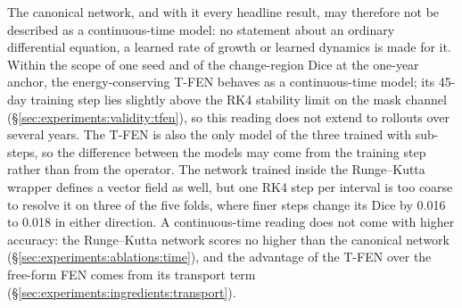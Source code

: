 The canonical network, and with it every headline result, may therefore
not be described as a continuous-time model: no statement about an ordinary
differential equation, a learned rate of growth or learned dynamics is made
for it. Within the scope of one seed and of the change-region Dice at the
one-year anchor, the energy-conserving T-FEN behaves as a continuous-time
model; its 45-day training step lies slightly above the RK4 stability limit
on the mask channel (\S\ref{sec:experiments:validity:tfen}), so this
reading does not extend to rollouts over several years. The T-FEN is also
the only model of the three trained with sub-steps, so the difference
between the models may come from the training step rather than from the
operator. The network trained inside the
Runge--Kutta wrapper defines a vector field as well, but one RK4 step per
interval is too coarse to resolve it on three of the five folds, where
finer steps change its Dice by 0.016 to 0.018 in either direction. A
continuous-time reading does not come with higher accuracy: the
Runge--Kutta network scores no higher than the canonical network
(\S\ref{sec:experiments:ablations:time}), and the advantage of the T-FEN
over the free-form FEN comes from its transport term
(\S\ref{sec:experiments:ingredients:transport}).

